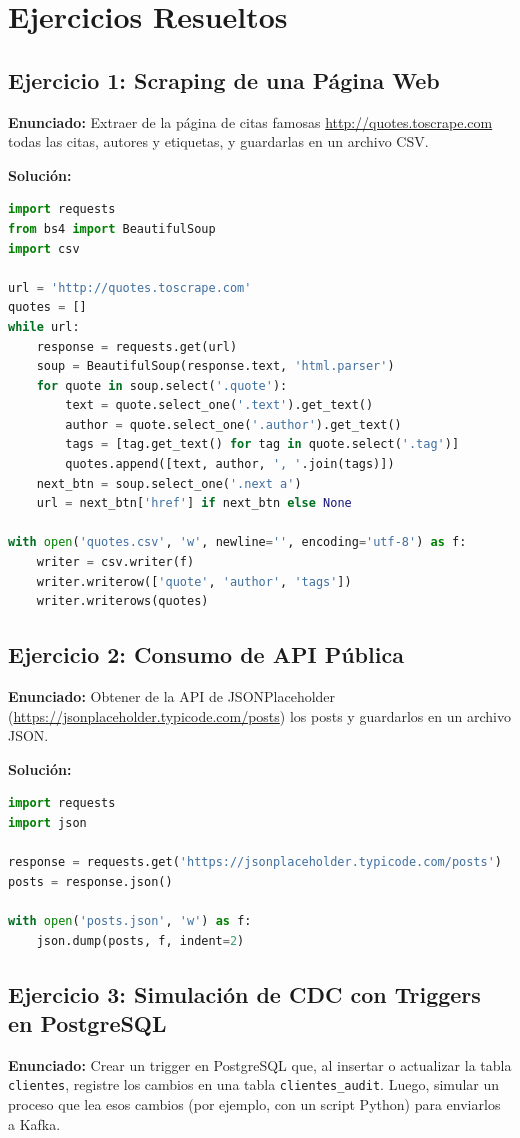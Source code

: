 \documentclass[12pt,a4paper,openany,oneside]{book}
\begin{document}
\chapter{Ejercicios Resueltos}
\section{Ejercicio 1: Scraping de una Página Web}
\textbf{Enunciado:} Extraer de la página de citas famosas \url{http://quotes.toscrape.com} todas las citas, autores y etiquetas, y guardarlas en un archivo CSV.

\textbf{Solución:}
\begin{lstlisting}[language=Python]
import requests
from bs4 import BeautifulSoup
import csv

url = 'http://quotes.toscrape.com'
quotes = []
while url:
    response = requests.get(url)
    soup = BeautifulSoup(response.text, 'html.parser')
    for quote in soup.select('.quote'):
        text = quote.select_one('.text').get_text()
        author = quote.select_one('.author').get_text()
        tags = [tag.get_text() for tag in quote.select('.tag')]
        quotes.append([text, author, ', '.join(tags)])
    next_btn = soup.select_one('.next a')
    url = next_btn['href'] if next_btn else None

with open('quotes.csv', 'w', newline='', encoding='utf-8') as f:
    writer = csv.writer(f)
    writer.writerow(['quote', 'author', 'tags'])
    writer.writerows(quotes)
\end{lstlisting}

\section{Ejercicio 2: Consumo de API Pública}
\textbf{Enunciado:} Obtener de la API de JSONPlaceholder (\url{https://jsonplaceholder.typicode.com/posts}) los posts y guardarlos en un archivo JSON.

\textbf{Solución:}
\begin{lstlisting}[language=Python]
import requests
import json

response = requests.get('https://jsonplaceholder.typicode.com/posts')
posts = response.json()

with open('posts.json', 'w') as f:
    json.dump(posts, f, indent=2)
\end{lstlisting}

\section{Ejercicio 3: Simulación de CDC con Triggers en PostgreSQL}
\textbf{Enunciado:} Crear un trigger en PostgreSQL que, al insertar o actualizar la tabla \texttt{clientes}, registre los cambios en una tabla \texttt{clientes\_audit}. Luego, simular un proceso que lea esos cambios (por ejemplo, con un script Python) para enviarlos a Kafka.
\end{document}
